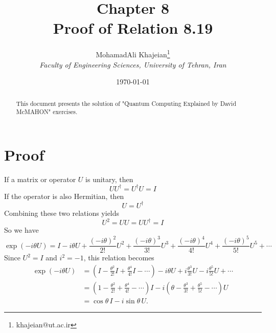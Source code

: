 \documentclass{article}
\title{\textbf{Chapter 8} \\ \small Proof of Relation 8.19}
\author{
    MohamadAli Khajeian\footnote{khajeian@ut.ac.ir} \\ 
    \small \textit{Faculty of Engineering Sciences, University of Tehran, Iran} \\ 
}
\date{\today}
\begin{document}
\maketitle

\begin{abstract}
    This document presents the solution of "Quantum Computing Explained by David McMAHON" exercises.
\end{abstract}

\section*{Proof}
If a matrix or operator $U$ is unitary, then
\[
UU^\dagger = U^\dagger U = I
\]
If the operator is also Hermitian, then
\[
U = U^\dagger
\]
Combining these two relations yields
\[
U^2 = UU = UU^\dagger = I
\]
So we have
\[
\exp(-i\theta U) = I - i\theta U + \frac{(-i\theta)^2}{2!} U^2 + \frac{(-i\theta)^3}{3!} U^3 + \frac{(-i\theta)^4}{4!} U^4 + \frac{(-i\theta)^5}{5!} U^5 + \cdots
\]
Since \( U^2 = I \) and \( i^2 = -1 \), this relation becomes
\begin{align*}
\exp(-i\theta U) &= \left( I - \frac{\theta^2}{2!} I + \frac{\theta^4}{4!} I - \cdots \right)
- i\theta U + i\frac{\theta^3}{3!} U - i\frac{\theta^5}{5!} U + \cdots\\
&= \left( 1 - \frac{\theta^2}{2!} + \frac{\theta^4}{4!} - \cdots \right)I - i \left( \theta - \frac{\theta^3}{3!} + \frac{\theta^5}{5!} - \cdots \right)U\\
&= \cos\theta \, I - i\sin\theta \, U.
\end{align*}
\end{document}
